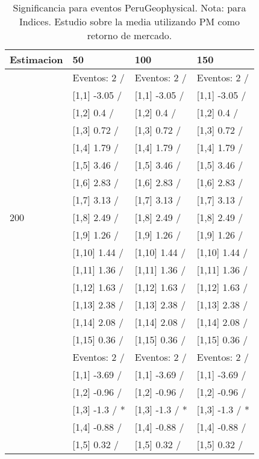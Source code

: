 \begin{table}

\caption{Significancia para eventos PeruGeophysical. Nota: para Indices. Estudio sobre la media utilizando PM como retorno de mercado.}
\centering
\begin{tabular}[t]{llll}
\toprule
Estimacion & 50 & 100 & 150\\
\midrule
 & Eventos:  2 / & Eventos:  2 / & Eventos:  2 /\\
 & {}[1,1] -3.05  / & {}[1,1] -3.05  / & {}[1,1] -3.05  /\\
 & {}[1,2] 0.4  / & {}[1,2] 0.4  / & {}[1,2] 0.4  /\\
 & {}[1,3] 0.72  / & {}[1,3] 0.72  / & {}[1,3] 0.72  /\\
 & {}[1,4] 1.79  / & {}[1,4] 1.79  / & {}[1,4] 1.79  /\\
\addlinespace
 & {}[1,5] 3.46  / & {}[1,5] 3.46  / & {}[1,5] 3.46  /\\
 & {}[1,6] 2.83  / & {}[1,6] 2.83  / & {}[1,6] 2.83  /\\
 & {}[1,7] 3.13  / & {}[1,7] 3.13  / & {}[1,7] 3.13  /\\
200 & {}[1,8] 2.49  / & {}[1,8] 2.49  / & {}[1,8] 2.49  /\\
 & {}[1,9] 1.26  / & {}[1,9] 1.26  / & {}[1,9] 1.26  /\\
\addlinespace
 & {}[1,10] 1.44  / & {}[1,10] 1.44  / & {}[1,10] 1.44  /\\
 & {}[1,11] 1.36  / & {}[1,11] 1.36  / & {}[1,11] 1.36  /\\
 & {}[1,12] 1.63  / & {}[1,12] 1.63  / & {}[1,12] 1.63  /\\
 & {}[1,13] 2.38  / & {}[1,13] 2.38  / & {}[1,13] 2.38  /\\
 & {}[1,14] 2.08  / & {}[1,14] 2.08  / & {}[1,14] 2.08  /\\
\addlinespace
 & {}[1,15] 0.36  / & {}[1,15] 0.36  / & {}[1,15] 0.36  /\\
 & Eventos:  2 / & Eventos:  2 / & Eventos:  2 /\\
 & {}[1,1] -3.69  / & {}[1,1] -3.69  / & {}[1,1] -3.69  /\\
 & {}[1,2] -0.96  / & {}[1,2] -0.96  / & {}[1,2] -0.96  /\\
 & {}[1,3] -1.3  / * & {}[1,3] -1.3  / * & {}[1,3] -1.3  / *\\
\addlinespace
 & {}[1,4] -0.88  / & {}[1,4] -0.88  / & {}[1,4] -0.88  /\\
 & {}[1,5] 0.32  / & {}[1,5] 0.32  / & {}[1,5] 0.32  /\\

\end{tabular}
\end{table}
